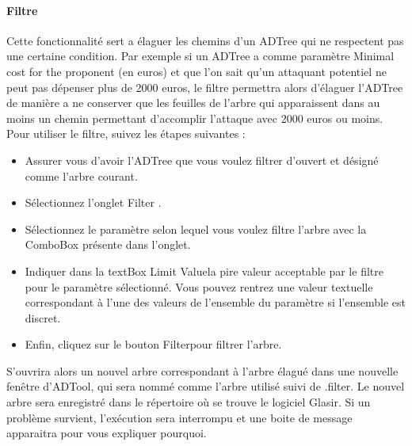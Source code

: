 \paragraph{Filtre}Cette fonctionnalité sert a élaguer les chemins d'un ADTree qui ne respectent pas une certaine condition. Par exemple si un ADTree a comme paramètre \og Minimal cost for the proponent \fg (en euros) et que l'on sait qu'un attaquant potentiel ne peut pas dépenser plus de 2000 euros, le filtre permettra alors d'élaguer l'ADTree de manière a ne conserver que les feuilles de l'arbre qui apparaissent dans au moins un chemin permettant d'accomplir l'attaque avec 2000 euros ou moins.
Pour utiliser le filtre, suivez les étapes suivantes :
\begin{itemize}
\item Assurer vous d'avoir l'ADTree que vous voulez filtrer d'ouvert et désigné comme l'arbre courant. 
\item Sélectionnez l'onglet \og Filter \fg .
\item Sélectionnez le paramètre selon lequel vous voulez filtre l'arbre avec la ComboBox présente dans l'onglet.
\item Indiquer dans la textBox \og Limit Value\fg la pire valeur acceptable par le filtre pour le paramètre sélectionné. Vous pouvez rentrez une valeur textuelle correspondant à l'une des valeurs de l'ensemble du paramètre si l'ensemble est discret.
\item Enfin, cliquez sur le bouton \og Filter\fg pour filtrer l'arbre.
\end{itemize}
S'ouvrira alors un nouvel arbre correspondant à l'arbre élagué dans une nouvelle fenêtre d'ADTool, qui sera nommé comme l'arbre utilisé suivi de \og .filter\fg . Le nouvel arbre sera enregistré dans le répertoire où se trouve le logiciel Glasir.
Si un problème survient, l'exécution sera interrompu et une boite de message apparaitra pour vous expliquer pourquoi.

